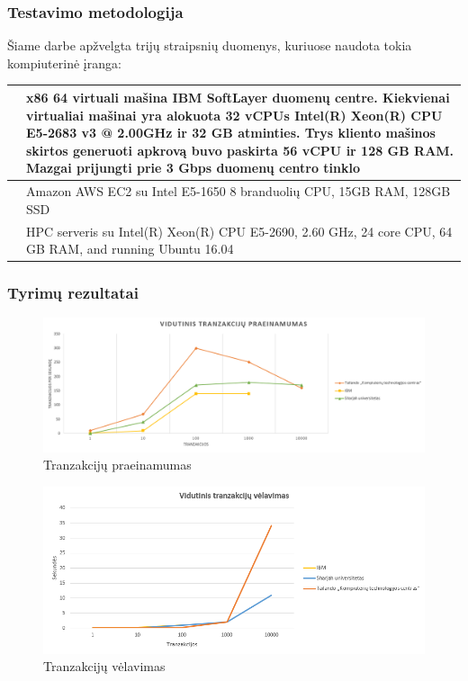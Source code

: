 \documentclass{VUMIFPSkursinis}
\begin{document}
		\subsubsection{Testavimo metodologija}
			Šiame darbe apžvelgta trijų straipsnių duomenys, kuriuose naudota tokia kompiuterinė įranga:
			\begin{center}
				\begin{tabular}{ | m{5em} | m{10cm}| } 
					\hline
					\cite{IMBResearch}& x86 64 virtuali mašina IBM SoftLayer duomenų centre. 
					Kiekvienai virtualiai mašinai yra alokuota 32 vCPUs  Intel(R) Xeon(R)
					CPU E5-2683 v3 @ 2.00GHz ir 32 GB atminties. Trys kliento mašinos skirtos generuoti apkrovą buvo paskirta
					 56 vCPU ir 128 GB RAM. Mazgai prijungti prie 3 Gbps duomenų centro tinklo  \\ 
					\hline
					 \cite{ThailandPerf}& Amazon AWS EC2
					 su Intel E5-1650 8 branduolių CPU,
					15GB RAM, 128GB SSD  \\ 
					\hline
					 \cite{ShaFabPerf}& HPC serveris
					su Intel(R) Xeon(R) CPU E5-2690, 2.60 GHz, 24 core
					CPU, 64 GB RAM, and running Ubuntu 16.04  \\ 
					\hline
				\end{tabular}
			\end{center}

		\subsubsection{Tyrimų rezultatai}
			\begin{figure}[H]
			    \centering
			    \includegraphics[scale=0.6]{img/Praein}
			    \caption{Tranzakcijų praeinamumas}   %
			    \label{img:mlp}
			\end{figure}		
			\begin{figure}[H]
			    \centering
			    \includegraphics[scale=0.6]{img/Velav}
			    \caption{Tranzakcijų vėlavimas}   %
			    \label{img:mlp}
			\end{figure}		
\end{document}
